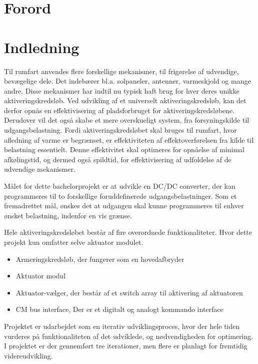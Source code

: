 
\chapter*{Forord}


{\let\clearpage\relax \chapter{Indledning}}
Til rumfart anvendes flere forskellige mekanismer, til frigørelse af udvendige, bevægelige dele. Det indebærer bl.a. solpaneler, antenner, varmeskjold og mange andre. Disse mekanismer har indtil nu typisk haft brug for hver deres unikke aktiveringskredsløb. Ved udvikling af et universelt aktiveringskredsløb, kan det derfor opnås en effektivisering af pladsforbruget for aktiveringskredsløbene. Derudover vil det også skabe et mere overskueligt system, fra forsyningskilde til udgangsbelastning. Fordi aktiveringskredsløbet skal bruges til rumfart, hvor afledning af varme er begrænset, er effektiviteten af effektoverførelsen fra kilde til belastning essentielt. Denne effektivitet skal optimeres for opnåelse af minimal afkølingstid, og dermed også spildtid, for effektivisering af udfoldelse af de udvendige mekanismer\cite{projekt-oplag}. 

Målet for dette bachelorprojekt er at udvikle en DC/DC converter, der kan programmeres til to forskellige foruddefinerede udgangsbelastninger. Som et fremadrettet mål, ønskes det at udgangen skal kunne programmeres til enhver ønsket belastning, indenfor en vis grænse. 

\noindent
Hele aktiveringskredsløbet består af fire overordnede funktionaliteter. Hvor dette projekt kun omfatter selve aktuator modulet.
\begin{itemize}
	\item Armeringskredsløb, der fungerer som en hovedafbryder
	\item Aktuator modul
	\item Aktuator-vælger, der består af et switch array til aktivering af aktuatoren
	\item CM bus interface, Der er et digitalt og analogt kommando interface
\end{itemize}

Projektet er udarbejdet som en iterativ udviklingsproces, hvor der hele tiden vurderes på funktionaliteten af det udviklede, og nødvendigheden for optimering. I projektet er der gennemført tre iterationer, men flere er planlagt for fremtidig videreudvikling. 

